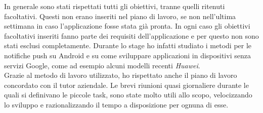\noindent In generale sono stati rispettati tutti gli obiettivi, tranne quelli ritenuti facoltativi. Questi non erano inseriti nel piano di lavoro, se
non nell'ultima settimana in caso l'applicazione fosse stata già pronta. In ogni caso gli obiettivi facoltativi inseriti fanno parte dei requisiti
dell'applicazione e per questo non sono stati esclusi completamente. Durante lo stage ho infatti studiato i metodi per le notifiche push su
\gls{Android} e su come sviluppare applicazioni in dispositivi senza servizi Google, come ad esempio alcuni modelli recenti \textit{Huawei}.
\\
\noindent Grazie al metodo di lavoro utilizzato, ho rispettato anche il piano di lavoro concordato con il tutor aziendale. Le brevi riunioni quasi
giornaliere durante le quali si definivano le piccole task, sono state molto utili allo scopo, velocizzando lo sviluppo e razionalizzando il
tempo a disposizione per ognuna di esse. 

